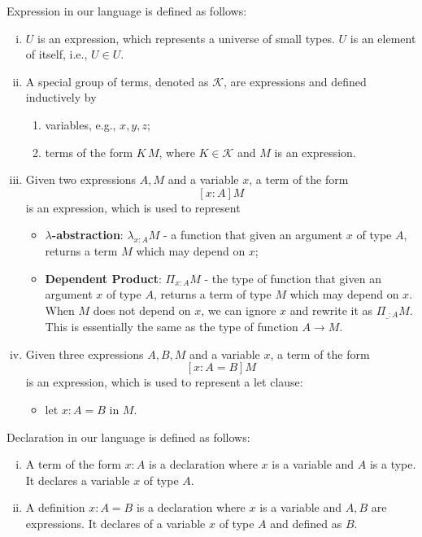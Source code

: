 Expression in our language is defined as follows:
\begin{definition}[Expression]\label{theory:def:exp}
  \leavevmode \vspace{-\baselineskip}
  \begin{enumerate}[(i)]
    \item $U$ is an expression, which represents a universe of small types. $U$ is an element of itself, i.e., $U \in U$.
    \item A special group of terms, denoted as $\mathcal{K}$, are expressions and defined inductively by
      \begin{enumerate}
      \item variables, e.g., $x,y,z$;
      \item terms of the form $K\,M$, where $K \in \mathcal{K}$ and $M$ is an expression. 
      \end{enumerate}
    \item Given two expressions $A, M$ and a variable $x$, a term of the form
      \[ [x : A] M \]
      is an expression, which is used to represent
      \begin{itemize}
        \item \textbf{$\lambda$-abstraction}: $\lambda_{x : A}M$ - a function that given an argument $x$ of type $A$, returns a term $M$ which may depend on $x$;
      \end{itemize}
      \begin{itemize}
        \item \textbf{Dependent Product}: $\Pi_{x : A}M$ - the type of function that given an argument $x$ of type $A$, returns a term of type $M$ which may depend on $x$. When $M$ does not depend on $x$, we can ignore $x$ and rewrite it as $\Pi_{\_:A}M$. This is essentially the same as the type of function $A \to M$.
      \end{itemize}
    \item Given three expressions $A,B,M$ and a variable $x$, a term of the form
      \[ [x : A = B] M \]
      is an expression, which is used to represent a let clause:
      \begin{itemize}
        \item let $x : A = B$ in $M$.
      \end{itemize}
  \end{enumerate}
\end{definition}

Declaration in our language is defined as follows:
\begin{definition}[Declaration]\label{theory:def:decl}
  \leavevmode \vspace{-\baselineskip}
  \begin{enumerate}[(i)]
  \item A term of the form $x : A$ is a declaration where $x$ is a variable and $A$ is a type. It declares a variable $x$ of type $A$.
  \item A definition $x : A = B$ is a declaration where $x$ is a variable and $A,B$ are expressions. It declares of a variable $x$ of type $A$ and defined as $B$.
  \end{enumerate}
\end{definition}


